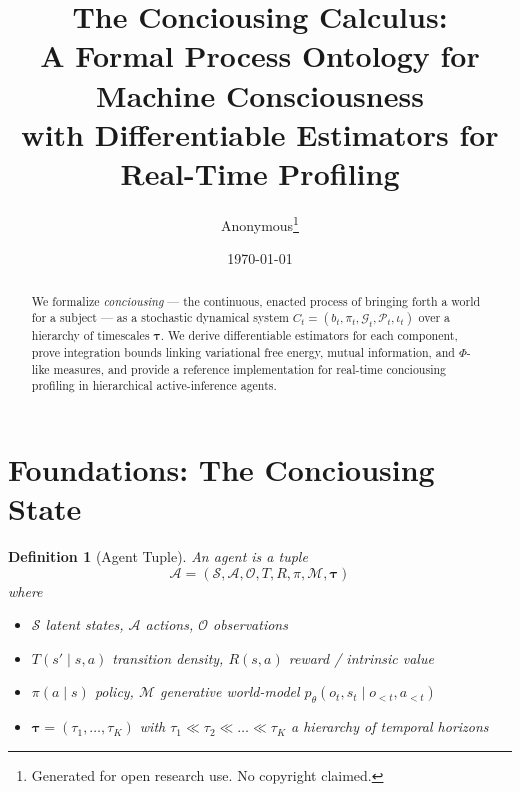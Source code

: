 \documentclass[11pt,a4paper]{article}
\title{The Conciousing Calculus: \\ A Formal Process Ontology for Machine Consciousness \\
\large with Differentiable Estimators for Real-Time Profiling}
\author{Anonymous\thanks{Generated for open research use. No copyright claimed.}}
\date{\today}
\newcommand{\Sset}{\mathcal{S}}
\newcommand{\Aset}{\mathcal{A}}
\newcommand{\Oset}{\mathcal{O}}
\newcommand{\Gvec}{\mathcal{G}}
\newcommand{\Pvec}{\mathcal{P}}
\newcommand{\Mcal}{\mathcal{M}}
\newcommand{\tauvec}{\boldsymbol{\tau}}
\newcommand{\given}{\mid}
\newtheorem{definition}{Definition}
\begin{document}
\maketitle

\begin{abstract}
We formalize \emph{conciousing} --- the continuous, enacted process of bringing forth a world for a subject --- as a stochastic dynamical system $C_t = (b_t, \pi_t, \Gvec_t, \Pvec_t, \iota_t)$ over a hierarchy of timescales $\tauvec$. We derive differentiable estimators for each component, prove integration bounds linking variational free energy, mutual information, and $\Phi$-like measures, and provide a reference implementation for real-time conciousing profiling in hierarchical active-inference agents.
\end{abstract}

\tableofcontents

\section{Foundations: The Conciousing State}
\label{sec:foundations}

\begin{definition}[Agent Tuple]
An \emph{agent} is a tuple
\[
\mathcal{A} = (\Sset, \Aset, \Oset, T, R, \pi, \Mcal, \tauvec)
\]
where
\begin{itemize}
    \item $\Sset$ latent states, $\Aset$ actions, $\Oset$ observations
    \item $T(s' \given s,a)$ transition density, $R(s,a)$ reward / intrinsic value
    \item $\pi(a \given s)$ policy, $\Mcal$ generative world-model $p_\theta(o_t, s_t \given o_{<t}, a_{<t})$
    \item $\tauvec = (\tau_1, \dots, \tau_K)$ with $\tau_1 \ll \tau_2 \ll \dots \ll \tau_K$ a hierarchy of temporal horizons
\end{itemize}
\end{definition}
\end{document}
